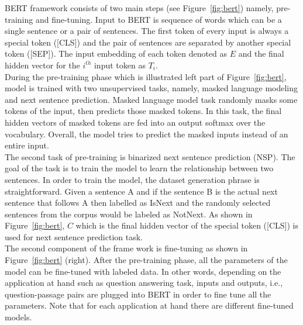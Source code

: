 \begin{itemize}
BERT framework consists of two main steps (see Figure~\ref{fig:bert}) namely, pre-training and fine-tuning. Input to BERT is sequence of words which can be a single sentence or a pair of sentences. The first token of every input is always a special token ([CLS]) and the pair of sentences are separated by another special token ([SEP]). The input embedding of each token denoted as $E$ and the final hidden vector for the $i^{th}$ input token as $T_i$. \\
During the pre-training phase which is illustrated left part of Figure~\ref{fig:bert}, model is trained with two unsupervised tasks, namely, masked language modeling and next sentence prediction.
Masked language model task randomly masks some tokens of the input, then predicts those masked tokens. In this task, the final hidden vectors of masked tokens are fed into an output softmax over the vocabulary. Overall, the model tries to predict the masked inputs instead of an entire input.\\
The second task of pre-training is binarized next sentence prediction (NSP). The goal of the task is to train the model to learn the relationship between two sentences. In order to train the model, the dataset generation phrase is straightforward. Given a sentence A and if the sentence B is the actual next sentence that follows A then labelled as IsNext and the randomly selected sentences from the corpus would be labeled as NotNext. As shown in Figure~\ref{fig:bert}, $C$ which is the final hidden vector of the special token ([CLS]) is used for next sentence prediction task.\\
The second component of the frame work is fine-tuning as shown in Figure~\ref{fig:bert} (right). After the pre-training phase, all the parameters of the model can be fine-tuned with labeled data. In other words, depending on the application at hand such as question answering task, inputs and outputs, i.e., question-passage pairs are plugged into BERT in order to fine tune all the parameters. Note that  for each application at hand there are different fine-tuned models. 


\end{itemize}

%
